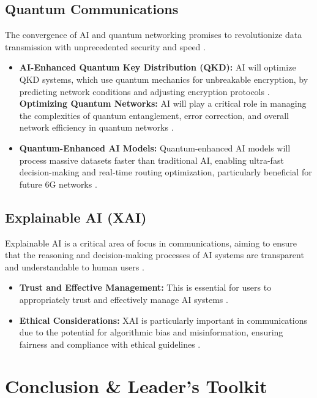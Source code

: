 \subsection{Quantum Communications}
The convergence of AI and quantum networking promises to revolutionize data transmission with unprecedented security and speed \cite{MarketsAndMarkets_Quantum}.
\begin{itemize}
    \item \textbf{AI-Enhanced Quantum Key Distribution (QKD):} AI will optimize QKD systems, which use quantum mechanics for unbreakable encryption, by predicting network conditions and adjusting encryption protocols \cite{Byanat_Quantum, AliroQuantum_Quantum}.
    \textbf{Optimizing Quantum Networks:} AI will play a critical role in managing the complexities of quantum entanglement, error correction, and overall network efficiency in quantum networks \cite{ACLDigital_Quantum}.
    \item \textbf{Quantum-Enhanced AI Models:} Quantum-enhanced AI models will process massive datasets faster than traditional AI, enabling ultra-fast decision-making and real-time routing optimization, particularly beneficial for future 6G networks \cite{TheBrighterSide_Quantum}.
\end{itemize}

\subsection{Explainable AI (XAI)}
Explainable AI is a critical area of focus in communications, aiming to ensure that the reasoning and decision-making processes of AI systems are transparent and understandable to human users \cite{Veritis_XAI, MDPI_XAI}.
\begin{itemize}
    \item \textbf{Trust and Effective Management:} This is essential for users to appropriately trust and effectively manage AI systems \cite{Veritis_XAI}.
    \item \textbf{Ethical Considerations:} XAI is particularly important in communications due to the potential for algorithmic bias and misinformation, ensuring fairness and compliance with ethical guidelines \cite{MDPI_XAI}.
\end{itemize}

\section{Conclusion \& Leader's Toolkit}

